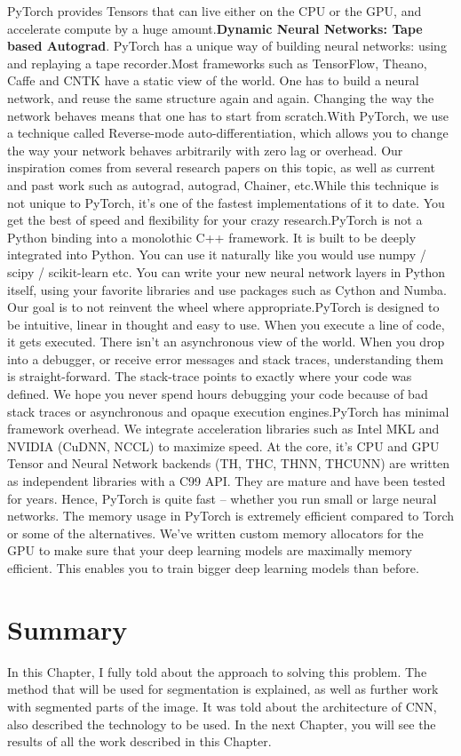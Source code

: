 \par PyTorch provides Tensors that can live either on the CPU or the GPU, and accelerate compute by a huge amount.\textbf{Dynamic Neural Networks: Tape based Autograd}. PyTorch has a unique way of building neural networks: using and replaying a tape recorder.Most frameworks such as TensorFlow, Theano, Caffe and CNTK have a static view of the world. One has to build a neural network, and reuse the same structure again and again. Changing the way the network behaves means that one has to start from scratch.With PyTorch, we use a technique called Reverse-mode auto-differentiation, which allows you to change the way your network behaves arbitrarily with zero lag or overhead. Our inspiration comes from several research papers on this topic, as well as current and past work such as autograd, autograd, Chainer, etc.While this technique is not unique to PyTorch, it’s one of the fastest implementations of it to date. You get the best of speed and flexibility for your crazy research.PyTorch is not a Python binding into a monolothic C++ framework. It is built to be deeply integrated into Python. You can use it naturally like you would use numpy / scipy / scikit-learn etc. You can write your new neural network layers in Python itself, using your favorite libraries and use packages such as Cython and Numba. Our goal is to not reinvent the wheel where appropriate.PyTorch is designed to be intuitive, linear in thought and easy to use. When you execute a line of code, it gets executed. There isn’t an asynchronous view of the world. When you drop into a debugger, or receive error messages and stack traces, understanding them is straight-forward. The stack-trace points to exactly where your code was defined. We hope you never spend hours debugging your code because of bad stack traces or asynchronous and opaque execution engines.PyTorch has minimal framework overhead. We integrate acceleration libraries such as Intel MKL and NVIDIA (CuDNN, NCCL) to maximize speed. At the core, it’s CPU and GPU Tensor and Neural Network backends (TH, THC, THNN, THCUNN) are written as independent libraries with a C99 API.
They are mature and have been tested for years.
Hence, PyTorch is quite fast – whether you run small or large neural networks.
The memory usage in PyTorch is extremely efficient compared to Torch or some of the alternatives. We’ve written custom memory allocators for the GPU to make sure that your deep learning models are maximally memory efficient. This enables you to train bigger deep learning models than before.


\section{Summary}\label{sec:4.5}
\par In this Chapter, I fully told about the approach to solving this problem. The method that will be used for segmentation is explained, as well as further work with segmented parts of the image. It was told about the architecture of CNN, also described the technology to be used. In the next Chapter, you will see the results of all the work described in this Chapter.